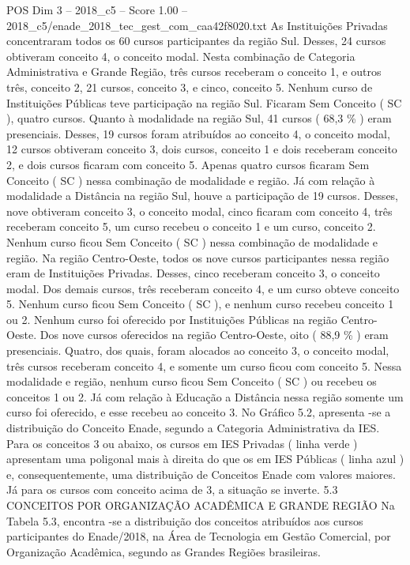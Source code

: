 \begin{textsample}{POS Dim 3 – 2018\_c5 – Score 1.00 – 2018\_c5/enade\_2018\_tec\_gest\_com\_caa42f8020.txt}
As Instituições Privadas concentraram todos os 60 cursos participantes da região Sul.
Desses, 24 cursos obtiveram conceito 4, o conceito modal.
Nesta combinação de Categoria Administrativa e Grande Região, três cursos receberam o conceito 1, e outros três, conceito 2, 21 cursos, conceito 3, e cinco, conceito 5.
Nenhum curso de Instituições Públicas teve participação na região Sul.
Ficaram Sem Conceito ( SC ), quatro cursos.
Quanto à modalidade na região Sul, 41 cursos ( 68,3 \% ) eram presenciais.
Desses, 19 cursos foram atribuídos ao conceito 4, o conceito modal, 12 cursos obtiveram conceito 3, dois cursos, conceito 1 e dois receberam conceito 2, e dois cursos ficaram com conceito 5.
Apenas quatro cursos ficaram Sem Conceito ( SC ) nessa combinação de modalidade e região.
Já com relação à modalidade a Distância na região Sul, houve a participação de 19 cursos.
Desses, nove obtiveram conceito 3, o conceito modal, cinco ficaram com conceito 4, três receberam conceito 5, um curso recebeu o conceito 1 e um curso, conceito 2.
Nenhum curso ficou Sem Conceito ( SC ) nessa combinação de modalidade e região.
Na região Centro-Oeste, todos os nove cursos participantes nessa região eram de Instituições Privadas.
Desses, cinco receberam conceito 3, o conceito modal.
Dos demais cursos, três receberam conceito 4, e um curso obteve conceito 5.
Nenhum curso ficou Sem Conceito ( SC ), e nenhum curso recebeu conceito 1 ou 2.
Nenhum curso foi oferecido por Instituições Públicas na região Centro-Oeste.
Dos nove cursos oferecidos na região Centro-Oeste, oito ( 88,9 \% ) eram presenciais.
Quatro, dos quais, foram alocados ao conceito 3, o conceito modal, três cursos receberam conceito 4, e somente um curso ficou com conceito 5.
Nessa modalidade e região, nenhum curso ficou Sem Conceito ( SC ) ou recebeu os conceitos 1 ou 2.
Já com relação à Educação a Distância nessa região somente um curso foi oferecido, e esse recebeu ao conceito 3.
No Gráfico 5.2, apresenta -se a distribuição do Conceito Enade, segundo a Categoria Administrativa da IES.
Para os conceitos 3 ou abaixo, os cursos em IES Privadas ( linha verde ) apresentam uma poligonal mais à direita do que os em IES Públicas ( linha azul ) e, consequentemente, uma distribuição de Conceitos Enade com valores maiores.
Já para os cursos com conceito acima de 3, a situação se inverte. 5.3 CONCEITOS POR ORGANIZAÇÃO ACADÊMICA E GRANDE REGIÃO Na Tabela 5.3, encontra -se a distribuição dos conceitos atribuídos aos cursos participantes do Enade/2018, na Área de Tecnologia em Gestão Comercial, por Organização Acadêmica, segundo as Grandes Regiões brasileiras.

\end{textsample}
